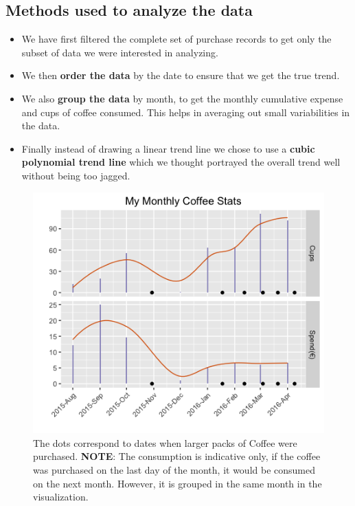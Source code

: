 \documentclass[a4paper,11pt]{article}
\begin{document}
\begin{multicols}{2}
\section*{Methods used to analyze the data}
\begin{itemize}
	\item We have first filtered the complete set of purchase records to get only the subset of data we were interested in analyzing.
	\item We then \textbf{order the data} by the date to ensure that we get the true trend.
	\item We also \textbf{group the data} by month, to get the monthly cumulative expense and cups of coffee consumed. This helps in averaging out small variabilities in the data.
	\item Finally instead of drawing a linear trend line we chose to use a \textbf{cubic polynomial trend line} which we thought portrayed the overall trend well without being too jagged.
\end{itemize}
\end{multicols}
\begin{figure}[h]
	\centering
	\includegraphics[scale=0.70]{FinalVis.png}
	\caption{The dots correspond to dates when larger packs of Coffee were purchased. \textbf{NOTE}: The consumption is indicative only, if the coffee was purchased on the last day of the month, it would be consumed on the next month. However, it is grouped in the same month in the visualization.
		}
	\label{fig}
\end{figure}
\end{document}
